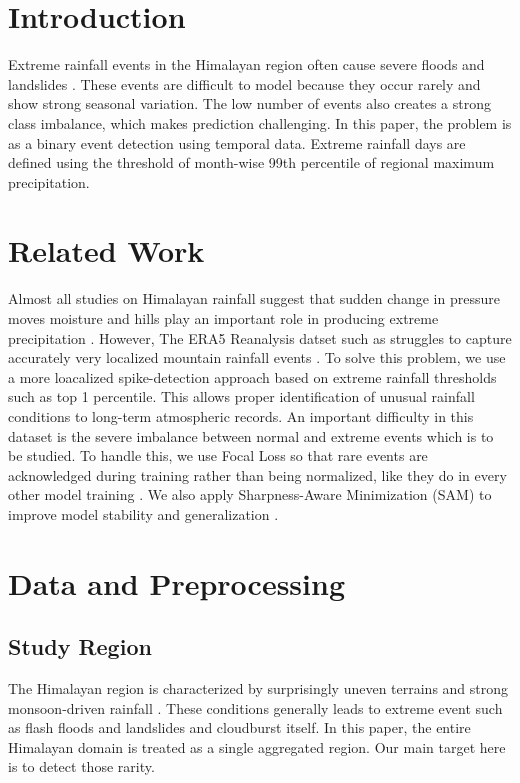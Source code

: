 \documentclass[runningheads]{llncs}
\begin{document}
\section{Introduction}

Extreme rainfall events in the Himalayan region often cause severe floods and landslides \cite{li2018wh,chen2021nepal,dollan2024hma}. These events are difficult to model because they occur rarely and show strong seasonal variation. The low number of events also creates a strong class imbalance, which makes prediction challenging. In this paper, the problem is as a binary event detection using temporal data. Extreme rainfall days are defined using the threshold of month-wise 99th percentile of regional maximum precipitation.


\section{Related Work}

Almost all studies on Himalayan rainfall suggest that sudden change in pressure moves moisture and hills play an important role in producing extreme precipitation \cite{li2018wh,chen2021nepal,dollan2024hma}. However, The ERA5 Reanalysis datset such as struggles to capture accurately very localized mountain rainfall events \cite{era5,chen2021nepal,dollan2024hma}. To solve this problem, we use a more loacalized spike-detection approach based on extreme rainfall thresholds such as top 1 percentile. This allows proper identification of unusual rainfall conditions to long-term atmospheric records. An important difficulty in this dataset is the severe imbalance between normal and extreme events which is to be studied. To handle this, we use Focal Loss so that rare events are acknowledged during training rather than being normalized, like they do in every other model training \cite{focal}. We also apply Sharpness-Aware Minimization (SAM) to improve model stability and generalization \cite{sam}.


\section{Data and Preprocessing}

\subsection{Study Region}
The Himalayan region is characterized by surprisingly uneven terrains and strong monsoon-driven rainfall \cite{li2018wh,chen2021nepal,dollan2024hma}. These conditions generally leads to extreme event such as flash floods and landslides and cloudburst itself. In this paper, the entire Himalayan domain is treated as a single aggregated region. Our main target here is to detect those rarity.
\end{document}
